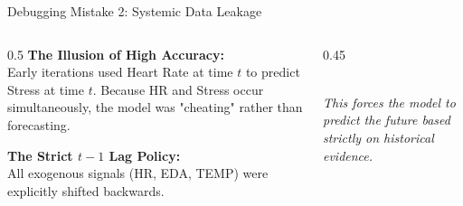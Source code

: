 \documentclass[aspectratio=169, xcolor={dvipsnames,table}]{beamer}
\begin{document}
\begin{frame}{Debugging Mistake 2: Systemic Data Leakage}
\begin{columns}
    \begin{column}{0.5\textwidth}
        \textbf{The Illusion of High Accuracy:}\\
        Early iterations used Heart Rate at time $t$ to predict Stress at time $t$. Because HR and Stress occur simultaneously, the model was "cheating" rather than forecasting.
        
        \vspace{0.4cm}
        \textbf{\color{Emerald}The Strict $t-1$ Lag Policy:}\\
        All exogenous signals (HR, EDA, TEMP) were explicitly shifted backwards. 
    \end{column}
    \begin{column}{0.45\textwidth}
        \vspace{0.3cm}\\
        \textit{This forces the model to predict the future based strictly on historical evidence.}
    \end{column}
\end{columns}
\end{frame}
\end{document}
